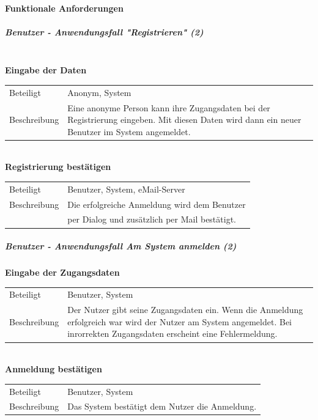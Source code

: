 \documentclass[12pt,a4paper]{article}
\begin{document}
\paragraph{Funktionale Anforderungen}
\subparagraph{Benutzer - Anwendungsfall "Registrieren" (2)}\mbox{}\\
\textbf{Eingabe der Daten}\\
\begin{tabular}{l| p{12cm}}
\hline 
Beteiligt & Anonym, System \\ 
Beschreibung & Eine anonyme Person kann ihre Zugangsdaten bei der Registrierung eingeben. Mit diesen Daten wird dann ein neuer Benutzer im System angemeldet.\\ 
\end{tabular}\\

\textbf{Registrierung bestätigen}\\
\begin{tabular}{l|p{12cm}}
\hline 
Beteiligt    & Benutzer, System, eMail-Server \\ 
Beschreibung & Die erfolgreiche Anmeldung wird dem Benutzer  \\
 			 & per Dialog und zusätzlich per Mail bestätigt. \\ 
\end{tabular} 

\newpage
\subparagraph{Benutzer - Anwendungsfall \glqq Am System anmelden \grqq (2)}\mbox{}

\textbf{Eingabe der Zugangsdaten}\\
\begin{tabular}{l|p{12cm}}
\hline 
Beteiligt & Benutzer, System \\ 
Beschreibung & Der Nutzer gibt seine Zugangsdaten ein. Wenn die Anmeldung erfolgreich war wird der Nutzer am System angemeldet. Bei inrorrekten Zugangsdaten erscheint eine Fehlermeldung. \\ 
\end{tabular}\\


\textbf{Anmeldung bestätigen}\\
\begin{tabular}{l|p{12cm}}
\hline 
Beteiligt & Benutzer, System \\ 
Beschreibung & Das System bestätigt dem Nutzer die Anmeldung. \\ 
\end{tabular}\\\\
\end{document}
